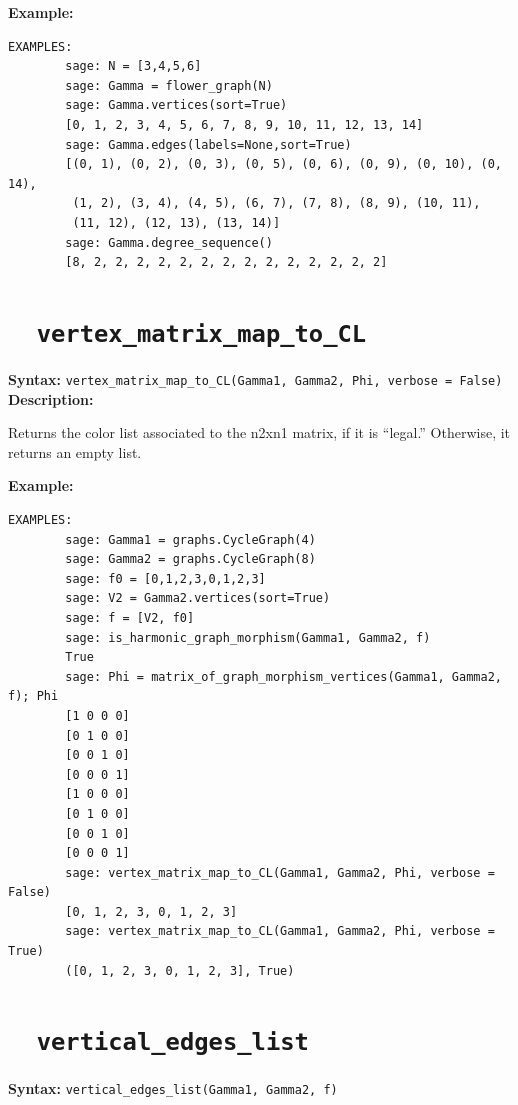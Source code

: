 \documentclass{article}
\begin{document}
\textbf{Example:}
\begin{verbatim}
EXAMPLES:
        sage: N = [3,4,5,6]  
        sage: Gamma = flower_graph(N)  
        sage: Gamma.vertices(sort=True)     
        [0, 1, 2, 3, 4, 5, 6, 7, 8, 9, 10, 11, 12, 13, 14]
        sage: Gamma.edges(labels=None,sort=True)    
        [(0, 1), (0, 2), (0, 3), (0, 5), (0, 6), (0, 9), (0, 10), (0, 14),
         (1, 2), (3, 4), (4, 5), (6, 7), (7, 8), (8, 9), (10, 11),
         (11, 12), (12, 13), (13, 14)]
        sage: Gamma.degree_sequence()    
        [8, 2, 2, 2, 2, 2, 2, 2, 2, 2, 2, 2, 2, 2, 2]
\end{verbatim}

\section{\tt \ \ vertex\_matrix\_map\_to\_CL}

\textbf{Syntax:} \verb}vertex_matrix_map_to_CL(Gamma1, Gamma2, Phi, verbose = False)}\\

\textbf{Description:}

Returns the color list associated to the n2xn1 matrix, if it is ``legal.''
Otherwise, it returns an empty list.

\textbf{Example:}
\begin{verbatim}
EXAMPLES:
        sage: Gamma1 = graphs.CycleGraph(4)     
        sage: Gamma2 = graphs.CycleGraph(8)      
        sage: f0 = [0,1,2,3,0,1,2,3]    
        sage: V2 = Gamma2.vertices(sort=True)    
        sage: f = [V2, f0]         
        sage: is_harmonic_graph_morphism(Gamma1, Gamma2, f) 
        True
        sage: Phi = matrix_of_graph_morphism_vertices(Gamma1, Gamma2, f); Phi 
        [1 0 0 0]
        [0 1 0 0]
        [0 0 1 0]
        [0 0 0 1]
        [1 0 0 0]
        [0 1 0 0]
        [0 0 1 0]
        [0 0 0 1]
        sage: vertex_matrix_map_to_CL(Gamma1, Gamma2, Phi, verbose = False)  
        [0, 1, 2, 3, 0, 1, 2, 3]
        sage: vertex_matrix_map_to_CL(Gamma1, Gamma2, Phi, verbose = True) 
        ([0, 1, 2, 3, 0, 1, 2, 3], True)
\end{verbatim}

\section{\tt \ \ vertical\_edges\_list}

\textbf{Syntax:} \verb}vertical_edges_list(Gamma1, Gamma2, f)}\\
\end{document}
